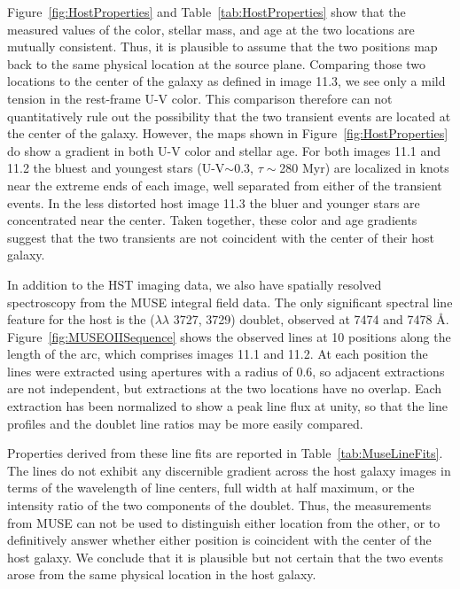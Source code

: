 Figure~\ref{fig:HostProperties} and Table~\ref{tab:HostProperties}
show that the measured values of the color, stellar mass, and age at
the two \spock locations are mutually consistent. Thus, it is
plausible to assume that the two positions map back to the same
physical location at the source plane.  Comparing those two locations
to the center of the galaxy as defined in image 11.3, we see only a
mild tension in the rest-frame U-V color. This comparison therefore
can not quantitatively rule out the possibility that the two transient
events are located at the center of the galaxy. However, the maps
shown in Figure~\ref{fig:HostProperties} do show a gradient in both
U-V color and stellar age. For both images 11.1 and 11.2 the bluest
and youngest stars (U-V$\sim$0.3, $\tau\sim$280 Myr) are localized in
knots near the extreme ends of each image, well separated from either
of the \spock transient events.  In the less distorted host image 11.3
the bluer and younger stars are concentrated near the center. Taken
together, these color and age gradients suggest that the two
transients are not coincident with the center of their host galaxy.

In addition to the HST imaging data, we also have spatially resolved
spectroscopy from the MUSE integral field data. The only significant
spectral line feature for the \spock host is the 
($\lambda\lambda$ 3727, 3729) doublet, observed at 7474 and 7478
\AA. Figure~\ref{fig:MUSEOIISequence} shows the observed
 lines at 10 positions along the length of the arc,
which comprises images 11.1 and 11.2.  At each position the lines were
extracted using apertures with a radius of 0.6\arcsec, so adjacent
extractions are not independent, but extractions at the two \spock
locations have no overlap. Each extraction has been normalized to show
a peak line flux at unity, so that the line profiles and the doublet
line ratios may be more easily compared.

Properties derived from these line fits are reported in
Table~\ref{tab:MuseLineFits}. The  lines do not exhibit
any discernible gradient across the host galaxy images in terms of the
wavelength of line centers, full width at half maximum, or the
intensity ratio of the two components of the doublet.  Thus, the
 measurements from MUSE can not be used to
distinguish either \spock location from the other, or to definitively
answer whether either position is coincident with the center of the
host galaxy.  We conclude that it is plausible but not certain that
the two \spock events arose from the same physical location in the
host galaxy.




